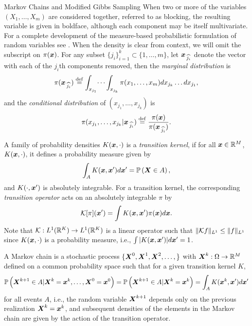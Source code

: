\begin{chapter}{Markov Chains and Modified Gibbs Sampling}
When two or more of the variables $(X_1,\dots,X_m)$ are considered together, referred to as blocking, the resulting variable is given in boldface, although each component may be itself multivariate.
For a complete development of the measure-based probabilistic formulation of random variables see \citep{durrett2010probability,billingsley2008probability}.
When the density is clear from context, we will omit the subscript on $\pi(\mbox{\boldmath$x$})$.
For any subset $\{j_i\}_{i=1}^k \subset \{1,\dots,m\}$, let $\mbox{\boldmath$x$}_{\,\widehat{j_i}}$ denote the vector with each of the $j_i$th components removed, then the \emph{marginal distribution} is
\begin{equation}
  \pi(\mbox{\boldmath$x$}_{\,\widehat{j_i}}) \stackrel{\rm def}{=} \int_{x_{j_1}}\dots\int_{x_{j_k}} \pi(x_1,\dots,x_m)dx_{j_k}\dots dx_{j_1},
\end{equation}
and the \emph{conditional distribution} of $(x_{j_1},\dots,x_{j_k})$ is
\begin{equation} \label{eq:conditionalDefn}
  \pi(x_{j_1},\dots,x_{j_k}|\mbox{\boldmath$x$}_{\,\widehat{j_i}}) \stackrel{\rm def}{=} \frac{\pi(\mbox{\boldmath$x$})}{\pi(\mbox{\boldmath$x$}_{\,\widehat{j_i}})}.
\end{equation}
  
A family of probability densities $K(\mbox{\boldmath$x$},\cdot)$ is a \emph{transition kernel}, if for all $\mbox{\boldmath$x$} \in \mathbb R^M$, $K(\mbox{\boldmath$x$},\cdot)$, it defines a probability measure given by 
\begin{equation}
  \int_A K(\mbox{\boldmath$x$},\mbox{\boldmath$x$}') d\mbox{\boldmath$x$}' = \mathbb P\left( \mbox{\boldmath$X$} \in A \right),
\end{equation}
and $K(\cdot , \mbox{\boldmath$x$}')$ is absolutely integrable.
For a transition kernel, the corresponding \emph{transition operator} acts on an absolutely integrable $\pi$ by
\begin{equation}
  \mathcal K [\pi](\mbox{\boldmath$x$}') = \int K(\mbox{\boldmath$x$},\mbox{\boldmath$x$}') \pi(\mbox{\boldmath$x$})d\mbox{\boldmath$x$}. \label{eq:transitionKernel}
\end{equation}
Note that $\mathcal K:L^1(\mathbb R^K) \to L^1(\mathbb R^K)$ is a linear operator such that $\|\mathcal K f\|_{L^1} \le \|f\|_{L^1}$ since $K(\mbox{\boldmath$x$},\cdot)$ is a probability measure, i.e., $\int |K(\mbox{\boldmath$x$},\mbox{\boldmath$x$}')|d\mbox{\boldmath$x$}' = 1$.

A Markov chain is a stochastic process $\{\mbox{\boldmath$X$}^0, \mbox{\boldmath$X$}^1,\mbox{\boldmath$X$}^2,\dots,\}$ with $\mbox{\boldmath$X$}^k:\Omega \to \mathbb R^M$ defined on a common probability space such that for a given transition kernel $K$,
\begin{equation}
  \mathbb P\left( \mbox{\boldmath$X$}^{k+1} \in A | \mbox{\boldmath$X$}^k= \mbox{\boldmath$x$}^k,\dots,\mbox{\boldmath$X$}^0=\mbox{\boldmath$x$}^0\right) 
    = \mathbb P\left( \mbox{\boldmath$X$}^{k+1} \in A | \mbox{\boldmath$X$}^k= \mbox{\boldmath$x$}^k\right) 
    = \int_A K(\mbox{\boldmath$x$}^k,\mbox{\boldmath$x$}') d\mbox{\boldmath$x$}'
\end{equation}
for all events $A$, i.e., the random variable $\mbox{\boldmath$X$}^{k+1}$ depends only on the previous realization $\mbox{\boldmath$X$}^k=\mbox{\boldmath$x$}^k$, and subsequent densities of the elements in the Markov chain are given by the action of the transition operator.


\end{chapter}
